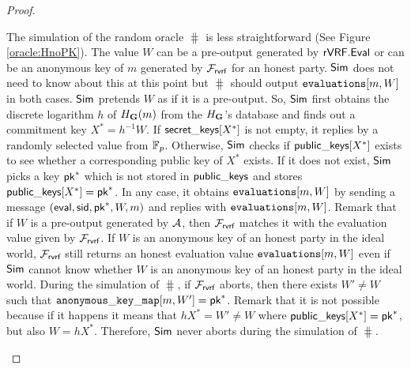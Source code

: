 \begin{proof}
\begin{itemize}
		 The simulation of the random oracle $ \hash $ is less straightforward (See Figure \ref{oracle:HnoPK}).
		The value $ W $ can be a pre-output generated by $ {\mathsf{rVRF}}.{\mathsf{Eval}} $ or can be an anonymous key of  $ m $ generated by $ \mathcal{F}_{\textsf{rvrf}} $ for an honest party. $ \mathsf{Sim} $ does not need to know about this at this point but $ \hash $ should output $ \texttt{evaluations}[m,W] $ in both cases.	 
		$ \mathsf{Sim} $ pretends $ W $ as if it is a pre-output. So, $ \mathsf{Sim} $ first obtains the discrete logarithm $ h $ of $ H_{\mathbf{G}}(m) $ from the $ H_{\mathbf{G}} $'s database and finds out a commitment key $ X^* = h^{-1}W $.    
		If  $ {\mathsf{secret\_keys}}[X^*] $ is not empty, it replies by a randomly selected value from $ \mathbb{F}_p $.
		Otherwise,
		$ \mathsf{Sim} $ checks if $ {\mathsf{public\_keys}}[X^*] $ exists to see whether a corresponding public key of $ X^* $ exists. If it does not exist, $ \mathsf{Sim} $ picks a key $ \mathsf{pk}^* $ which is not stored in $ {\mathsf{public\_keys}} $ and stores $ {\mathsf{public\_keys}}[X^*] = \mathsf{pk}^* $. In any case, it obtains $ \texttt{evaluations}[m,W] $ by sending a message $ (\mathsf{eval}, \textsf{sid},\mathsf{pk}^*,W,m) $ and replies with $ \texttt{evaluations}[m,W] $.
		Remark that if $ W $ is a pre-output generated by $ \mathcal{A} $, then $ \mathcal{F}_{\textsf{rvrf}} $ matches it with the evaluation value given by $ \mathcal{F}_{\textsf{rvrf}} $. If $ W $ is an anonymous key of an honest party in the ideal world, $ \mathcal{F}_{\textsf{rvrf}} $ still returns an honest evaluation value $ \texttt{evaluations}[m,W] $ even if $ \mathsf{Sim} $ cannot know whether $ W $ is an anonymous key of an honest party in the ideal world. 
		During the simulation of $ \hash $, if $ \mathcal{F}_{\textsf{rvrf}} $ aborts, then there exists $ W' \neq W $ such that $ \mathtt{anonymous\_key\_map}[m,W'] = \mathsf{pk}^* $. Remark that it is not possible because if it happens it means that $ hX^* = W' \neq W  $ where $ {\mathsf{public\_keys}}[X^*] = \mathsf{pk}^* $, but also $ W = hX^* $. 
		Therefore, $ \mathsf{Sim} $ never aborts during the simulation of $ \hash $.
		

\end{itemize}
\end{proof}
